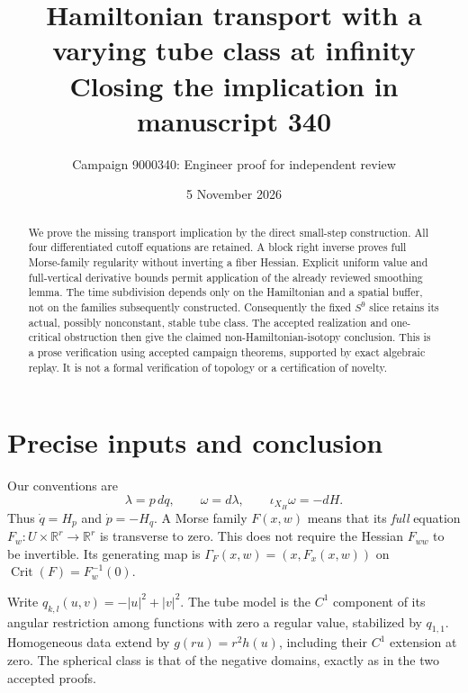 \documentclass[11pt]{article}
\title{Hamiltonian transport with a varying tube class at infinity\\
\large Closing the implication in manuscript 340}
\author{Campaign 9000340: Engineer proof for independent review}
\date{5 November 2026}
\newcommand{\R}{\mathbb R}
\newcommand{\Crit}{\operatorname{Crit}}
\begin{document}
\maketitle

\begin{abstract}
We prove the missing transport implication by the direct small-step
construction. All four differentiated cutoff equations are retained.
A block right inverse proves full Morse-family regularity without
inverting a fiber Hessian. Explicit uniform value and full-vertical
derivative bounds permit application of the already reviewed smoothing
lemma. The time subdivision depends only on the Hamiltonian and a
spatial buffer, not on the families subsequently constructed. Consequently
the fixed \(S^9\) slice retains its actual, possibly nonconstant, stable
tube class. The accepted realization and one-critical obstruction then
give the claimed non-Hamiltonian-isotopy conclusion.
This is a prose verification using accepted campaign theorems, supported
by exact algebraic replay. It is not a formal verification of topology
or a certification of novelty.
\end{abstract}

\section{Precise inputs and conclusion}

Our conventions are
\[
 \lambda=p\,dq,\qquad \omega=d\lambda,\qquad
 \iota_{X_H}\omega=-dH.
 \tag{1}
\]
Thus \(\dot q=H_p\) and \(\dot p=-H_q\).
A Morse family \(F(x,w)\) means that its \emph{full} equation
\(F_w:U\times\R^r\to\R^r\) is transverse to zero.
This does not require the Hessian \(F_{ww}\) to be invertible.
Its generating map is \(\Gamma_F(x,w)=(x,F_x(x,w))\) on
\(\Crit(F)=F_w^{-1}(0)\).

Write \(q_{k,l}(u,v)=-|u|^2+|v|^2\).
The tube model is the \(C^1\) component of its angular restriction
among functions with zero a regular value, stabilized by \(q_{1,1}\).
Homogeneous data extend by \(g(ru)=r^2h(u)\), including their
\(C^1\) extension at zero. The spherical class is that of the
negative domains, exactly as in the two accepted proofs.
\end{document}
